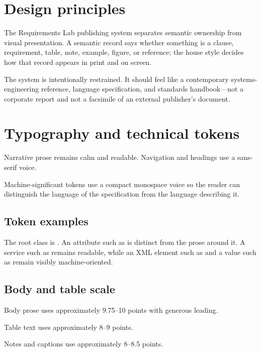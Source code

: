 \documentclass{requirements-lab}
\begin{document}
\RLCoverPage
\RLDocumentStatusPage
\RLHowToReadPage

\tableofcontents
\clearpage

\section{Design principles}
\RLAccentRule
\RLBodyFont
The Requirements Lab publishing system separates semantic ownership from visual presentation. A semantic record says whether something is a clause, requirement, table, note, example, figure, or reference; the house style decides how that record appears in print and on screen.

The system is intentionally restrained. It should feel like a contemporary systems-engineering reference, language specification, and standards handbook—not a corporate report and not a facsimile of an external publisher's document.




\clearpage
\section{Typography and technical tokens}
\RLAccentRule
\RLBodyFont
Narrative prose remains calm and readable. Navigation and headings use a sans-serif voice.

Machine-significant tokens use a compact monospace voice so the reader can distinguish the language of the specification from the language describing it.

\subsection{Token examples}
The root class is . An attribute such as  is distinct from the prose around it. A service such as  remains readable, while an XML element such as  and a value such as  remain visibly machine-oriented.

\subsection{Body and table scale}
\RLBodyFont Body prose uses approximately 9.75–10 points with generous leading. \par
\RLTableFont Table text uses approximately 8–9 points. \par
\RLSmallFont Notes and captions use approximately 8–8.5 points.
\end{document}
